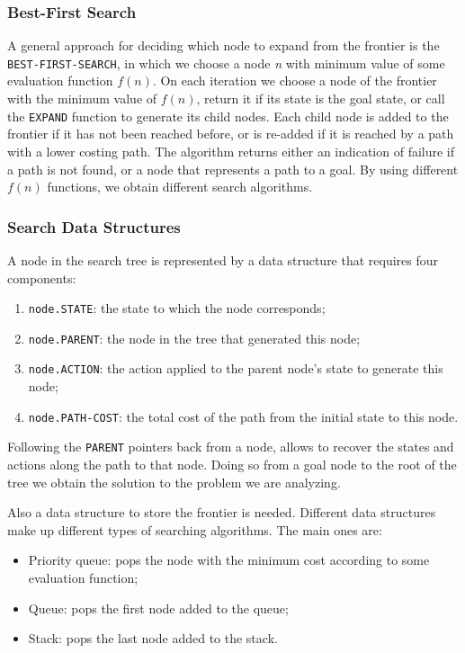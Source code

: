 \documentclass{article}
\begin{document}
\subsubsection{Best-First Search}
A general approach for deciding which node to expand from the frontier is the \lstinline{BEST-FIRST-SEARCH}, in which we choose a node \textit{n} with minimum value of some evaluation function $f(n)$. On each iteration we choose a node of the frontier with the minimum value of $f(n)$, return it if its state is the goal state, or call the \lstinline{EXPAND} function to generate its child nodes. Each child node is added to the frontier if it has not been reached before, or is re-added if it is reached by a path with a lower costing path. The algorithm returns either an indication of failure if a path is not found, or a node that represents a path to a goal. By using different $f(n)$ functions, we obtain different search algorithms.

\subsubsection{Search Data Structures}
A node in the search tree is represented by a data structure that requires four components:
\begin{enumerate}
    \item \lstinline{node.STATE}: the state to which the node corresponds;
    \item \lstinline{node.PARENT}: the node in the tree that generated this node;
    \item \lstinline{node.ACTION}: the action applied to the parent node's state to generate this node;
    \item \lstinline{node.PATH-COST}: the total cost of the path from the initial state to this node.
\end{enumerate}

Following the \lstinline{PARENT} pointers back from a node, allows to recover the states and actions along the path to that node. Doing so from a goal node to the root of the tree we obtain the solution to the problem we are analyzing. 

Also a data structure to store the frontier is needed. Different data structures make up different types of searching algorithms. The main ones are:
\begin{itemize}
    \item Priority queue: pops the node with the minimum cost according to some evaluation function;
    \item Queue: pops the first node added to the queue;
    \item Stack: pops the last node added to the stack.
\end{itemize}
\end{document}
